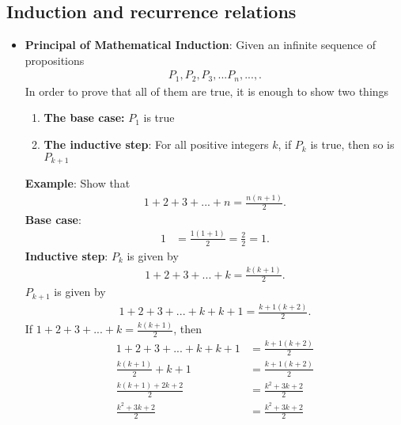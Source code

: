 \documentclass{report}
\begin{document}
    \pagebreak 
    \subsection{Induction and recurrence relations}
    \begin{itemize}
        \item \textbf{Principal of Mathematical Induction}: Given an infinite sequence of propositions
            \begin{align*}
                P_{1}, P_{2}, P_{3},...P_{n},...,
            .\end{align*}
            In order to prove that all of them are true, it is enough to show two things
            \begin{enumerate}
                \item \textbf{The base case:} $P_{1}$ is true
                \item \textbf{The inductive step}: For all positive integers $k$, if $P_{k}$ is true, then so is $P_{k+1}$
            \end{enumerate}
            \bigbreak \noindent 
            \textbf{Example}: Show that 
            \begin{align*}
                1 + 2 + 3 + ... + n = \frac{n(n+1)}{2}
            .\end{align*}
            \textbf{Base case}:
            \begin{align*}
                1 &= \frac{1(1+1)}{2} = \frac{2}{2} = 1
            .\end{align*}
            \bigbreak \noindent 
            \textbf{Inductive step}: $P_{k}$ is given by
            \begin{align*}
                1 + 2 + 3 + ... + k = \frac{k(k+1)}{2}
            .\end{align*}
            \bigbreak \noindent 
            $P_{k+1}$ is given by
            \begin{align*}
                1 + 2 + 3 + ... + k + k+1 = \frac{k+1(k+2)}{2}
            .\end{align*}
            If $1+2+3+...+k  = \frac{k(k+1)}{2}$, then
            \begin{align*}
                1 + 2 + 3 + ... + k + k+1 &= \frac{k+1(k+2)}{2} \\
                \frac{k(k+1)}{2} + k + 1 &= \frac{k+1(k+2)}{2} \\
                \frac{k(k+1) + 2k + 2}{2} &= \frac{k^{2} + 3k + 2}{2} \\
                \frac{k^{2} + 3k  + 2}{2} &= \frac{k^{2} + 3k + 2}{2}

\end{align*}
\end{itemize}
\end{document}
